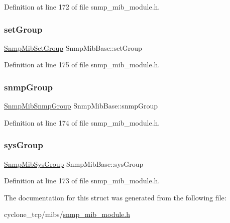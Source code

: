 Definition at line 172 of file snmp\+\_\+mib\+\_\+module.\+h.

\mbox{\label{structSnmpMibBase_a8e53c5823bcff63d0ab2bab9c072d9f8}} 
\subsubsection{\texorpdfstring{set\+Group}{setGroup}}
{\footnotesize\ttfamily \hyperlink{structSnmpMibSetGroup}{Snmp\+Mib\+Set\+Group} Snmp\+Mib\+Base\+::set\+Group}



Definition at line 175 of file snmp\+\_\+mib\+\_\+module.\+h.

\mbox{\label{structSnmpMibBase_a89b0e0c469a39dc7467e91e2276151b4}} 
\subsubsection{\texorpdfstring{snmp\+Group}{snmpGroup}}
{\footnotesize\ttfamily \hyperlink{structSnmpMibSnmpGroup}{Snmp\+Mib\+Snmp\+Group} Snmp\+Mib\+Base\+::snmp\+Group}



Definition at line 174 of file snmp\+\_\+mib\+\_\+module.\+h.

\mbox{\label{structSnmpMibBase_a8b498a1a01d473f23df938241e56e71b}} 
\subsubsection{\texorpdfstring{sys\+Group}{sysGroup}}
{\footnotesize\ttfamily \hyperlink{structSnmpMibSysGroup}{Snmp\+Mib\+Sys\+Group} Snmp\+Mib\+Base\+::sys\+Group}



Definition at line 173 of file snmp\+\_\+mib\+\_\+module.\+h.



The documentation for this struct was generated from the following file\+:\begin{DoxyCompactItemize}
\item 
cyclone\+\_\+tcp/mibs/\hyperlink{snmp__mib__module_8h}{snmp\+\_\+mib\+\_\+module.\+h}\end{DoxyCompactItemize}
